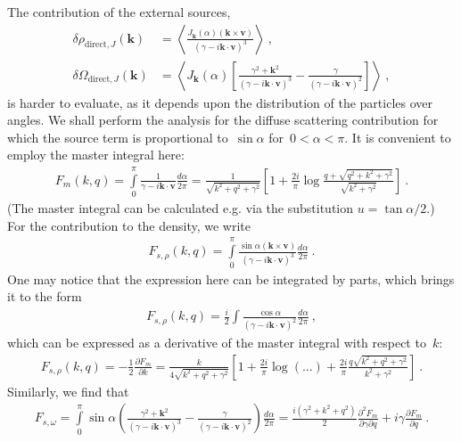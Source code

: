 \documentclass[preprint,aps,eqsecnum]{revtex4-1}
\begin{document}
The contribution of the external sources,
\begin{align}
  \delta \rho_{\mathrm{direct},J}({\bm k}) &=
  \left\langle \frac{J_{\bm k}(\alpha) ({\bm k}\times{\bm v})}{
     (\gamma - i {\bm k}\cdot{\bm v})^3}\right\rangle\ , \\  
  \delta \Omega_{\mathrm{direct},J}({\bm k}) &=
    \left\langle J_{\bm k}(\alpha) \left[
    \frac{\gamma^2 + {\bm k}^2}{(\gamma - i {\bm k}\cdot{\bm v})^3}
   - \frac{\gamma}{\left(\gamma - i {\bm k} \cdot{\bm v}\right)^2}
     \right]                                          
     \right\rangle\ , 
\end{align}
is harder to evaluate, as it depends upon the distribution of
the particles over angles.  We shall perform the analysis
for the diffuse scattering contribution for which
the source term is proportional to~$\sin\alpha$
for~$0 < \alpha < \pi$. It is convenient to employ
the master integral here:
\begin{align}
  F_m(k, q) = \int\limits_{0}^{\pi} \frac{1}{\gamma - i {\bm k} \cdot{\bm v}}
  \frac{d\alpha}{2\pi}
  = \frac{1}{\sqrt{k^2 + q^2 + \gamma^2}}
  \left[1 + \frac{2i}{\pi} \log\frac{q + \sqrt{q^2 + k^2 + \gamma^2}}{
      \sqrt{k^2 + \gamma^2}}\right]\ . 
\end{align}
(The master integral can be calculated e.g. via the substitution
$u = \tan \alpha/2$.)
For the contribution to the density, we write
\begin{align}
  F_{s, \rho}(k, q)
  =  \int\limits_{0}^{\pi} \frac{\sin\alpha ({\bm k}\times{\bm v})}{
  \left(\gamma - i {\bm k} \cdot {\bm v}\right)^3} \frac{d\alpha}{2\pi} \ . 
\end{align}
One may notice that the expression here can be integrated by parts,
which brings it to the form
\begin{align}
  F_{s, \rho}(k, q) = \frac{i}{2} \int\frac{\cos\alpha}{
                    \left(\gamma - i {\bm k} \cdot {\bm v}\right)^2}
  \frac{d\alpha}{2\pi} \ , 
\end{align}
which can be expressed as a derivative of the master integral
with respect to~$k$:
\begin{align}
  F_{s, \rho}(k, q) = -\frac{1}{2} \frac{\partial F_m}{\partial k}
  = \frac{k}{4\sqrt{k^2 + q^2 + \gamma^2}}
  \left[1 + \frac{2i}{\pi} \log(\ldots)
   + \frac{2i}{\pi} \frac{q \sqrt{k^2 + q^2 + \gamma^2}}{k^2 + \gamma^2}
  \right]\ . 
\end{align}
Similarly, we find that
\begin{align}
  F_{s, \omega} = \int\limits_{0}^{\pi}
  \sin\alpha \left( \frac{\gamma^2 + {\bm k}^2}{
          \left(\gamma - i {\bm k}\cdot{\bm v}\right)^3}
  - \frac{\gamma}{ \left(\gamma - i {\bm k}\cdot{\bm v}\right)^2}
  \right) \frac{d\alpha}{2\pi}
  = \frac{i(\gamma^2 + k^2 + q^2)}{2}
  \frac{\partial^2 F_m}{\partial\gamma \partial q}
  + i \gamma \frac{\partial F_m}{\partial q}\ . 
\end{align}
\end{document}
